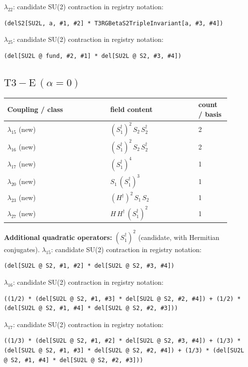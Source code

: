 \documentclass[9pt,a4paper]{article}
\begin{document}
\textbf{$ \lambda_{22} $}: candidate SU(2) contraction in registry notation:
\begin{lstlisting}[mathescape=true]
(delS2[SU2L, a, #1, #2] * T3RGBetaS2TripleInvariant[a, #3, #4])
\end{lstlisting}

\textbf{$ \lambda_{25} $}: candidate SU(2) contraction in registry notation:
\begin{lstlisting}[mathescape=true]
(del[SU2L @ fund, #2, #1] * del[SU2L @ S2, #3, #4])
\end{lstlisting}

\subsection*{$ \mathrm{T3-E}\,(\alpha=0) $}
\begin{longtable}{@{}p{0.42\linewidth}p{0.36\linewidth}p{0.13\linewidth}@{}}
\toprule
Coupling / class & field content & count / basis\\
\midrule
\endhead
$\lambda_{15}$ (new) & $\left(S_1^\dagger\right)^{2}\, S_2\, S_2^\dagger$ & 2 \\
$\lambda_{16}$ (new) & $\left(S_1^\dagger\right)^{2}\, S_2\, S_2^\dagger$ & 2 \\
$\lambda_{17}$ (new) & $\left(S_1^\dagger\right)^{4}$ & 1 \\
$\lambda_{20}$ (new) & $S_1\, \left(S_1^\dagger\right)^{3}$ & 1 \\
$\lambda_{23}$ (new) & $\left(H^\dagger\right)^{2}\, S_1\, S_2$ & 1 \\
$\lambda_{27}$ (new) & $H\, H^\dagger\, \left(S_1^\dagger\right)^{2}$ & 1 \\
\bottomrule
\end{longtable}
\textbf{Additional quadratic operators:}
$\left(S_1^\dagger\right)^{2}$ (candidate, with Hermitian conjugates).
\textbf{$ \lambda_{15} $}: candidate SU(2) contraction in registry notation:
\begin{lstlisting}[mathescape=true]
(del[SU2L @ S2, #1, #2] * del[SU2L @ S2, #3, #4])
\end{lstlisting}

\textbf{$ \lambda_{16} $}: candidate SU(2) contraction in registry notation:
\begin{lstlisting}[mathescape=true]
((1/2) * (del[SU2L @ S2, #1, #3] * del[SU2L @ S2, #2, #4]) + (1/2) * (del[SU2L @ S2, #1, #4] * del[SU2L @ S2, #2, #3]))
\end{lstlisting}

\textbf{$ \lambda_{17} $}: candidate SU(2) contraction in registry notation:
\begin{lstlisting}[mathescape=true]
((1/3) * (del[SU2L @ S2, #1, #2] * del[SU2L @ S2, #3, #4]) + (1/3) * (del[SU2L @ S2, #1, #3] * del[SU2L @ S2, #2, #4]) + (1/3) * (del[SU2L @ S2, #1, #4] * del[SU2L @ S2, #2, #3]))
\end{lstlisting}
\end{document}
